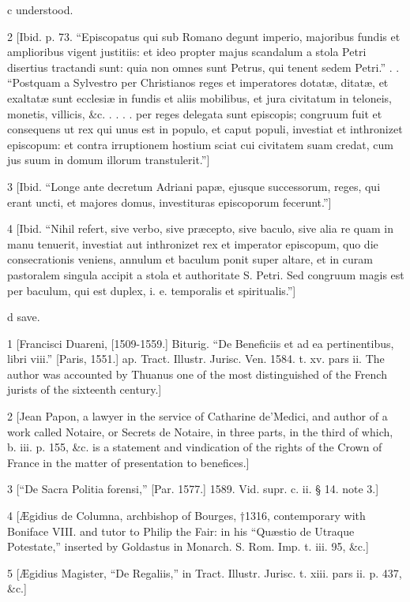 c
understood.

2
[Ibid. p. 73. “Episcopatus qui sub Romano degunt imperio, majoribus fundis et amplioribus vigent justitiis: et ideo propter majus scandalum a stola Petri disertius tractandi sunt: quia non omnes sunt Petrus, qui tenent sedem Petri.” . . “Postquam a Sylvestro per Christianos reges et imperatores dotatæ, ditatæ, et exaltatæ sunt ecclesiæ in fundis et aliis mobilibus, et jura civitatum in teloneis, monetis, villicis, &c. . . . . per reges delegata sunt episcopis; congruum fuit et consequens ut rex qui unus est in populo, et caput populi, investiat et inthronizet episcopum: et contra irruptionem hostium sciat cui civitatem suam credat, cum jus suum in domum illorum transtulerit.”]

3
[Ibid. “Longe ante decretum Adriani papæ, ejusque successorum, reges, qui erant uncti, et majores domus, investituras episcoporum fecerunt.”]

4
[Ibid. “Nihil refert, sive verbo, sive præcepto, sive baculo, sive alia re quam in manu tenuerit, investiat aut inthronizet rex et imperator episcopum, quo die consecrationis veniens, annulum et baculum ponit super altare, et in curam pastoralem singula accipit a stola et authoritate S. Petri. Sed congruum magis est per baculum, qui est duplex, i. e. temporalis et spiritualis.”]

d
save.

1
[Francisci Duareni, [1509-1559.] Biturig. “De Beneficiis et ad ea pertinentibus, libri viii.” [Paris, 1551.] ap. Tract. Illustr. Jurisc. Ven. 1584. t. xv. pars ii. The author was accounted by Thuanus one of the most distinguished of the French jurists of the sixteenth century.]

2
[Jean Papon, a lawyer in the service of Catharine de’Medici, and author of a work called Notaire, or Secrets de Notaire, in three parts, in the third of which, b. iii. p. 155, &c. is a statement and vindication of the rights of the Crown of France in the matter of presentation to benefices.]

3
[“De Sacra Politia forensi,” [Par. 1577.] 1589. Vid. supr. c. ii. § 14. note 3.]

4
[Ægidius de Columna, archbishop of Bourges, †1316, contemporary with Boniface VIII. and tutor to Philip the Fair: in his “Quæstio de Utraque Potestate,” inserted by Goldastus in Monarch. S. Rom. Imp. t. iii. 95, &c.]

5
[Ægidius Magister, “De Regaliis,” in Tract. Illustr. Jurisc. t. xiii. pars ii. p. 437, &c.]

